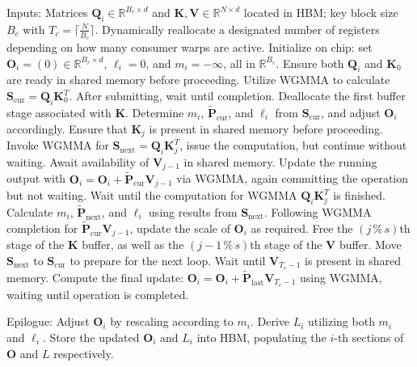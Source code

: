 \begin{algorithm}[H]
    \caption{\small\label{alg:flash3_wgmma}\textsc{FlashAttention-3} Consumer Warpgroup Forward Pass}
    \begin{algorithmic}[1]
      \REQUIRE  Inputs: Matrices $\mathbf{Q}_i \in \mathbb{R}^{B_r \times d}$ and $\mathbf{K}, \mathbf{V} \in \mathbb{R}^{N \times d}$ located in HBM; key block size $B_c$ with $T_c = \lceil \frac{N}{B_c} \rceil$.
      \STATE Dynamically reallocate a designated number of registers depending on how many consumer warps are active.
      \STATE Initialize on chip: set $\mathbf{O}_i = (0) \in \mathbb{R}^{B_r \times d}$, $\ell_i = 0$, and $m_i = -\infty$, all in $\mathbb{R}^{B_r}$.
      \STATE Ensure both $\mathbf{Q}_i$ and $\mathbf{K}_0$ are ready in shared memory before proceeding.
      \STATE Utilize WGMMA to calculate $\mathbf{S}_{\mathrm{cur}} = \mathbf{Q}_i \mathbf{K}_0^T$. After submitting, wait until completion.
      \STATE Deallocate the first buffer stage associated with $\mathbf{K}$.
      \STATE Determine $m_{i}$, $\tilde{\mathbf{P}}_{\mathrm{cur}}$, and $\ell_{i}$ from $\mathbf{S}_{\mathrm{cur}}$, and adjust $\mathbf{O}_i$ accordingly.
        \STATE Ensure that $\mathbf{K}_j$ is present in shared memory before proceeding.
        \label{code:mainloop_start}
        \STATE Invoke WGMMA for $\mathbf{S}_{\mathrm{next}} = \mathbf{Q}_i \mathbf{K}_{j}^T$, issue the computation, but continue without waiting. \label{code:first_wgmma}
        \STATE Await availability of $\mathbf{V}_{j-1}$ in shared memory.
        \STATE Update the running output with $\mathbf{O}_{i} = \mathbf{O}_{i} + \tilde{\mathbf{P}}_{\mathrm{cur}} \mathbf{V}_{j-1}$ via WGMMA, again committing the operation but not waiting. \label{code:second_wgmma}
        \STATE Wait until the computation for WGMMA $\mathbf{Q}_i \mathbf{K}_{j}^T$ is finished.
        \STATE Calculate $m_{i}$, $\tilde{\mathbf{P}}_{\mathrm{next}}$, and $\ell_{i}$ using results from $\mathbf{S}_{\mathrm{next}}$. \label{code:softmax}
        \STATE Following WGMMA completion for $\tilde{\mathbf{P}}_{\mathrm{cur}} \mathbf{V}_{j-1}$, update the scale of $\mathbf{O}_i$ as required.
        \STATE Free the $(j\,\%\,s)$th stage of the $\mathbf{K}$ buffer, as well as the $(j-1\,\%\,s)$th stage of the $\mathbf{V}$ buffer.
        \STATE Move $\mathbf{S}_{\mathrm{next}}$ to $\mathbf{S}_{\mathrm{cur}}$ to prepare for the next loop.
        \label{code:mainloop_end}
      \ENDFOR \STATE Wait until $\mathbf{V}_{T_c - 1}$ is present in shared memory.
      \STATE Compute the final update:
      $\mathbf{O}_{i} = \mathbf{O}_{i} + \tilde{\mathbf{P}}_{\mathrm{last}} \mathbf{V}_{T_c - 1}$ using WGMMA, waiting until operation is completed.

\STATE Epilogue: Adjust $\mathbf{O}_{i}$ by rescaling according to $m_{i}$. Derive $L_{i}$ utilizing both $m_{i}$ and $\ell_{i}$. Store the updated $\mathbf{O}_{i}$ and $L_{i}$ into HBM, populating the $i$-th sections of $\mathbf{O}$ and $L$ respectively.
    \end{algorithmic}
  \end{algorithm}

